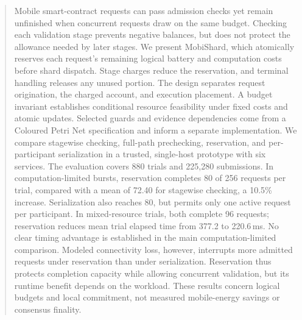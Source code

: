 \begin{abstract}
Mobile smart-contract requests can pass admission checks yet remain unfinished
when concurrent requests draw on the same budget. Checking each validation
stage prevents negative balances, but does not protect the allowance needed
by later stages. We present MobiShard, which atomically reserves each request's
remaining logical battery and computation costs before shard dispatch. Stage
charges reduce the reservation, and terminal handling releases any unused
portion. The design separates request origination, the charged account, and
execution placement. A budget invariant establishes conditional resource
feasibility under fixed costs and atomic updates. Selected guards and evidence
dependencies come from a Coloured Petri Net specification and inform a separate
implementation. We compare stagewise checking, full-path prechecking,
reservation, and per-participant serialization in a trusted, single-host
prototype with six services. The evaluation covers 880 trials and 225,280
submissions. In computation-limited bursts, reservation completes 80 of 256
requests per trial, compared with a mean of 72.40 for stagewise checking,
a 10.5\% increase. Serialization also reaches 80, but permits only one active
request per participant. In mixed-resource trials, both complete 96 requests;
reservation reduces mean trial elapsed time from 377.2 to 220.6\,ms. No clear
timing advantage is established in the main computation-limited comparison.
Modeled connectivity loss, however, interrupts more admitted requests under
reservation than under serialization. Reservation thus protects completion
capacity while allowing concurrent validation, but its runtime benefit depends
on the workload. These results concern logical budgets and local commitment,
not measured mobile-energy savings or consensus finality.
\end{abstract}
